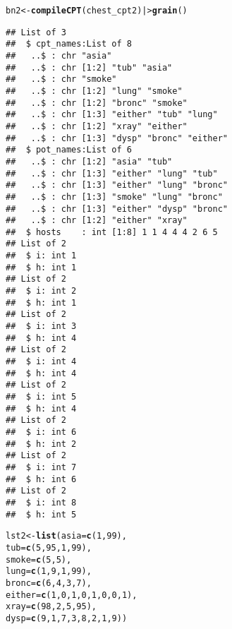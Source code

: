 \documentclass[10pt]{article}\usepackage[]{graphicx}\usepackage[]{xcolor}
\makeatletter
\newcommand{\hlnum}[1]{\textcolor[rgb]{0.686,0.059,0.569}{#1}}%
\newcommand{\hlstd}[1]{\textcolor[rgb]{0.345,0.345,0.345}{#1}}%
\newcommand{\hlkwb}[1]{\textcolor[rgb]{0.69,0.353,0.396}{#1}}%
\newcommand{\hlkwc}[1]{\textcolor[rgb]{0.333,0.667,0.333}{#1}}%
\newcommand{\hlkwd}[1]{\textcolor[rgb]{0.737,0.353,0.396}{\textbf{#1}}}%
\newenvironment{kframe}{%
 \def\at@end@of@kframe{}%
 \ifinner\ifhmode%
  \def\at@end@of@kframe{\end{minipage}}%
  \begin{minipage}{\columnwidth}%
 \fi\fi%
 \def\FrameCommand##1{\hskip\@totalleftmargin \hskip-\fboxsep
 \colorbox{shadecolor}{##1}\hskip-\fboxsep
     \hskip-\linewidth \hskip-\@totalleftmargin \hskip\columnwidth}%
 \MakeFramed {\advance\hsize-\width
   \@totalleftmargin\z@ \linewidth\hsize
   \@setminipage}}%
 {\par\unskip\endMakeFramed%
 \at@end@of@kframe}
\newenvironment{knitrout}{}{} %
\makeatother
\begin{document}
\begin{enumerate}
\begin{knitrout}
\begin{kframe}
\begin{alltt}
\hlstd{bn2} \hlkwb{<-} \hlkwd{compileCPT}\hlstd{(chest_cpt2) |>} \hlkwd{grain}\hlstd{()}
\end{alltt}
\begin{verbatim}
## List of 3
##  $ cpt_names:List of 8
##   ..$ : chr "asia"
##   ..$ : chr [1:2] "tub" "asia"
##   ..$ : chr "smoke"
##   ..$ : chr [1:2] "lung" "smoke"
##   ..$ : chr [1:2] "bronc" "smoke"
##   ..$ : chr [1:3] "either" "tub" "lung"
##   ..$ : chr [1:2] "xray" "either"
##   ..$ : chr [1:3] "dysp" "bronc" "either"
##  $ pot_names:List of 6
##   ..$ : chr [1:2] "asia" "tub"
##   ..$ : chr [1:3] "either" "lung" "tub"
##   ..$ : chr [1:3] "either" "lung" "bronc"
##   ..$ : chr [1:3] "smoke" "lung" "bronc"
##   ..$ : chr [1:3] "either" "dysp" "bronc"
##   ..$ : chr [1:2] "either" "xray"
##  $ hosts    : int [1:8] 1 1 4 4 4 2 6 5
## List of 2
##  $ i: int 1
##  $ h: int 1
## List of 2
##  $ i: int 2
##  $ h: int 1
## List of 2
##  $ i: int 3
##  $ h: int 4
## List of 2
##  $ i: int 4
##  $ h: int 4
## List of 2
##  $ i: int 5
##  $ h: int 4
## List of 2
##  $ i: int 6
##  $ h: int 2
## List of 2
##  $ i: int 7
##  $ h: int 6
## List of 2
##  $ i: int 8
##  $ h: int 5
\end{verbatim}
\begin{alltt}
\hlstd{lst2} \hlkwb{<-} \hlkwd{list}\hlstd{(}\hlkwc{asia}\hlstd{=}\hlkwd{c}\hlstd{(}\hlnum{1}\hlstd{,} \hlnum{99}\hlstd{),}
            \hlkwc{tub}\hlstd{=}\hlkwd{c}\hlstd{(}\hlnum{5}\hlstd{,} \hlnum{95}\hlstd{,} \hlnum{1}\hlstd{,} \hlnum{99}\hlstd{),}
            \hlkwc{smoke}\hlstd{=}\hlkwd{c}\hlstd{(}\hlnum{5}\hlstd{,} \hlnum{5}\hlstd{),}
            \hlkwc{lung}\hlstd{=}\hlkwd{c}\hlstd{(}\hlnum{1}\hlstd{,} \hlnum{9}\hlstd{,} \hlnum{1}\hlstd{,} \hlnum{99}\hlstd{),}
            \hlkwc{bronc}\hlstd{=}\hlkwd{c}\hlstd{(}\hlnum{6}\hlstd{,} \hlnum{4}\hlstd{,} \hlnum{3}\hlstd{,} \hlnum{7}\hlstd{),}
            \hlkwc{either}\hlstd{=}\hlkwd{c}\hlstd{(}\hlnum{1}\hlstd{,} \hlnum{0}\hlstd{,} \hlnum{1}\hlstd{,} \hlnum{0}\hlstd{,} \hlnum{1}\hlstd{,} \hlnum{0}\hlstd{,} \hlnum{0}\hlstd{,} \hlnum{1}\hlstd{),}
            \hlkwc{xray}\hlstd{=}\hlkwd{c}\hlstd{(}\hlnum{98}\hlstd{,} \hlnum{2}\hlstd{,} \hlnum{5}\hlstd{,} \hlnum{95}\hlstd{),}
            \hlkwc{dysp}\hlstd{=}\hlkwd{c}\hlstd{(}\hlnum{9}\hlstd{,} \hlnum{1}\hlstd{,} \hlnum{7}\hlstd{,} \hlnum{3}\hlstd{,} \hlnum{8}\hlstd{,} \hlnum{2}\hlstd{,} \hlnum{1}\hlstd{,} \hlnum{9}\hlstd{))}


\end{alltt}
\end{kframe}
\end{knitrout}
\end{enumerate}
\end{document}
